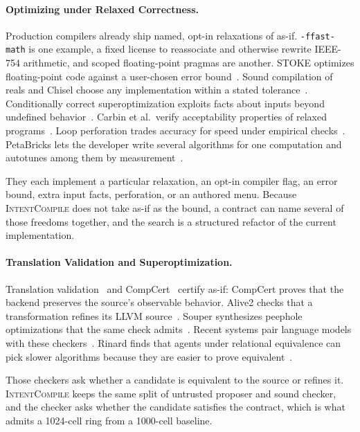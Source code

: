 \paragraph{Optimizing under Relaxed Correctness.}
Production compilers already ship named, opt-in relaxations of as-if.
\texttt{-ffast-math} is one example, a fixed license to reassociate and
otherwise rewrite IEEE-754 arithmetic, and scoped floating-point pragmas
are another. STOKE optimizes floating-point code against
a user-chosen error bound~\cite{schkufza2014fp}. Sound compilation of reals
and Chisel choose
any implementation within a stated
tolerance~\cite{darulova2014sound,misailovic2014chisel}. Conditionally
correct superoptimization exploits facts about inputs beyond undefined
behavior~\cite{sharma2015conditionally}. Carbin et al.\ verify acceptability
properties of relaxed programs~\cite{carbin2012relaxed}. Loop perforation
trades accuracy for speed under empirical
checks~\cite{sidiroglou2011managing}. PetaBricks lets the developer write
several algorithms for one computation and autotunes among them by
measurement~\cite{ansel2009petabricks}.

They each implement a particular relaxation, an opt-in compiler flag, an
error bound, extra input facts, perforation, or an authored menu. Because \textsc{IntentCompile}
does not take as-if as the bound, a contract can name several of those
freedoms together, and the search is a structured refactor of the current
implementation.

\paragraph{Translation Validation and Superoptimization.}
Translation validation~\cite{pnueli1998translation,necula2000translation}
and CompCert~\cite{leroy2009backend} certify as-if: CompCert proves that the
backend preserves the source's observable behavior. Alive2 checks that a
transformation refines its LLVM
source~\cite{lopes2021alive2, lee2017taming}. Souper synthesizes peephole
optimizations that the same check
admits~\cite{sasnauskas2017souper}. Recent systems pair language models
with these checkers~\cite{taneja2025llmvectorizer,fang2026llmveriopt}.
Rinard finds that agents under relational equivalence can pick slower
algorithms because they are easier to prove
equivalent~\cite{rinard2026quantitative}.

Those checkers ask whether a candidate is equivalent to the source or
refines it. \textsc{IntentCompile} keeps the same split of untrusted
proposer and sound checker, and the checker asks whether the candidate
satisfies the contract, which is what admits a 1024-cell ring from a
1000-cell baseline.

